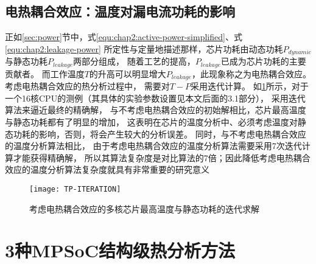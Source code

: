 \subsection{电热耦合效应：温度对漏电流功耗的影响}
正如\ref{sec:power}节中，式\ref{equ:chap2:active-power-simplified}、式\ref{equ:chap2:leakage-power} 所定性与定量地描述那样，芯片功耗由动态功耗$P_{dynamic}$与静态功耗$P_{leakage}$两部分组成， 随着工艺的提高，$P_{leakage}$已成为芯片功耗的主要贡献者。 而工作温度$T$的升高可以明显增大$P_{leakage}$，此现象称之为电热耦合效应。考虑电热耦合效应的热分析过程中， 需要对$T-P$采用迭代计算。
如\ref{fig:tp-iteration}所示，对于一个16核CPU的测例（其具体的实验参数设置见本文后面的3.1部分）， 采用迭代算法来逼近最终的精确解， 与不考虑电热耦合效应的初始解相比，芯片最高温度与静态功耗都有了明显的增加， 这表明在芯片的温度分析中、必须考虑温度对静态功耗的影响，否则，将会产生较大的分析误差。 同时，与不考虑电热耦合效应的温度分析算法相比， 由于考虑电热耦合效应的温度分析算法需要采用7次迭代计算才能获得精确解， 所以其算法复杂度是对比算法的7倍；因此降低考虑电热耦合效应的温度分析算法复杂度就具有非常重要的研究意义
\begin{figure}[H]
  \centering
  \texttt{[image: TP-ITERATION]}
  \caption{考虑电热耦合效应的多核芯片最高温度与静态功耗的迭代求解}
  \label{fig:tp-iteration}
\end{figure}


\section{3种MPSoC结构级热分析方法}
\label{sec:SSTAmethod}

